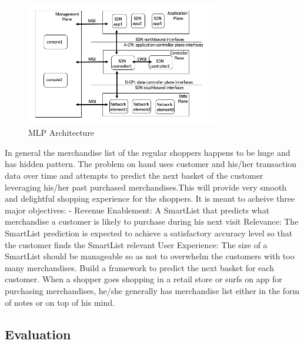 \begin{figure}[t]
  \centering 
  \includegraphics[width=3.3in]{img/MLP.png} 
  \caption{MLP Architecture} 
  \label{fig:MLP} 
\end{figure}

In general the merchandise list of the regular shoppers happens to be huge and has hidden pattern. 
The problem on hand uses customer and his/her transaction data over time and attempts to predict 
the next basket of the customer leveraging his/her past purchased merchandises.This will provide 
very smooth and delightful shopping experience for the shoppers. It is meant to acheive three major 
objectives: - Revenue Enablement: A SmartList that predicts what merchandise a customer is likely to 
purchase during his next visit Relevance: The SmartList prediction is expected to achieve a 
satisfactory accuracy level so that the customer finds the SmartList relevant User Experience: 
The size of a SmartList should be manageable so as not to overwhelm the customers with too many 
merchandises. Build a framework to predict the next basket for each customer.
When a shopper goes shopping in a retail store or surfs on app for purchasing merchandises, 
he/she generally has merchandise list either in the form of notes or on top of his mind. 

\subsection{Evaluation}

